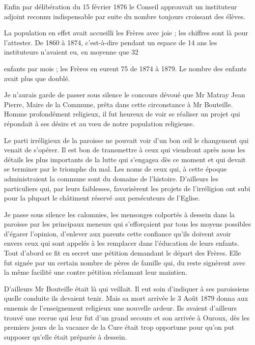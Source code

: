 Enfin par délibération du 15 février 1876 le Conseil approuvait un instituteur adjoint reconnu indispensable par suite du nombre toujours croissant des élèves.

La population en effet avait accueilli les Frères avec joie ; les chiffres sont là pour l'attester. De 1860 à 1874, c'est-à-dire pendant un espace de 14 ans les instituteurs n'avaient eu, en moyenne que 32

enfants par mois ; les Frères en eurent 75 de 1874 à 1879. Le nombre des enfants avait plus que doublé.

Je n'aurais garde de passer sous silence le concours dévoué que Mr Matray Jean Pierre, Maire de la Commune, prêta dans cette circonstance à Mr Bouteille. Homme profondément religieux, il fut heureux de voir se réaliser un projet qui répondait à ses désirs et au vœu de notre population religieuse.

Le parti irréligieux de la paroisse ne pouvait voir d'un bon œil le changement qui venait de s'opérer. Il est bon de transmettre à ceux qui viendront après nous les détails les plus importants de la lutte qui s'engagea dès ce moment et qui devait se terminer par le triomphe du mal. Les noms de ceux qui, à cette époque administraient la commune sont du domaine de l'histoire. D'ailleurs les particuliers qui, par leurs faiblesses, favorisèrent les projets de l'irréligion ont subi pour la plupart le châtiment réservé aux persécuteurs de l'Eglise.

Je passe sous silence les calomnies, les mensonges colportés à dessein dans la paroisse par les principaux meneurs qui s'efforçaient par tous les moyens possibles d'égarer l'opinion, d'enlever aux parents cette confiance qu'ils doivent avoir envers ceux qui sont appelés à les remplacer dans l'éducation de leurs enfants. Tout d'abord se fit en secret une pétition demandant le départ des Frères. Elle
fut signée par un certain nombre de pères de famille qui, du reste signèrent avec la même facilité une contre pétition réclamant leur maintien.

D'ailleurs Mr Bouteille était là qui veillait. Il eut soin d'indiquer à ses paroissiens quelle conduite ils devaient tenir. Mais sa mort arrivée le 3 Août 1879 donna aux ennemis de l'enseignement religieux une nouvelle ardeur. Ils avaient d'ailleurs trouvé une recrue qui leur fut d'un grand secours et son arrivée à Ouroux, dès les premiers jours de la vacance de la Cure était trop opportune pour qu'on put supposer qu'elle était préparée à dessein.


